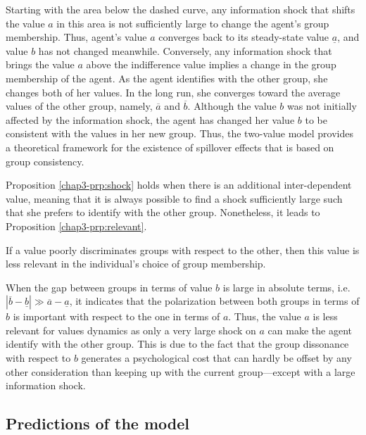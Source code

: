 Starting with the area below the dashed curve, any information shock that shifts the value $a$ in this area is not sufficiently large to change the agent's group membership. Thus, agent's value $a$ converges back to its steady-state value $\underline{a}$, and value $b$ has not changed meanwhile.
Conversely, any information shock that brings the value $a$ above the indifference value implies a change in the group membership of the agent. As the agent identifies with the other group, she changes both of her values. In the long run, she converges toward the average values of the other group, namely, $\overline{a}$ and $\overline{b}$. Although the value $b$ was not initially affected by the information shock, the agent has changed her value $b$ to be consistent with the values in her new group. Thus, the two-value model provides a theoretical framework for the existence of spillover effects that is based on group consistency.

Proposition \ref{chap3-prp:shock} holds when there is an additional inter-dependent value, meaning that it is always possible to find a shock sufficiently large such that she prefers to identify with the other group.
Nonetheless, it leads to Proposition \ref{chap3-prp:relevant}.%
\begin{proposition}\label{chap3-prp:relevant}
    If a value poorly discriminates groups with respect to the other, then this value is less relevant in the individual's choice of group membership.
\end{proposition}%
When the gap between groups in terms of value $b$ is large in absolute terms, i.e. $\left|\overline{b}-\underline{b}\right| \gg \overline{a}-\underline{a}$, it indicates that the polarization between both groups in terms of $b$ is important with respect to the one in terms of $a$. Thus, the value $a$ is less relevant for values dynamics as only a very large shock on $a$ can make the agent identify with the other group. This is due to the fact that the group dissonance with respect to $b$ generates a psychological cost that can hardly be offset by any other consideration than keeping up with the current group---except with a large information shock.

\subsection{Predictions of the model}

